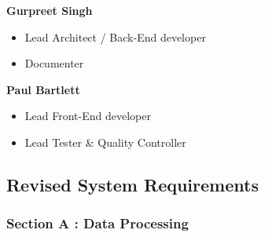 \documentclass[11pt,]{article}
\begin{document}
\textbf{Gurpreet Singh}

\begin{itemize}
\item
  Lead Architect / Back-End developer
\item
  Documenter
\end{itemize}

\textbf{Paul Bartlett}

\begin{itemize}
\item
  Lead Front-End developer
\item
  Lead Tester \& Quality Controller
\end{itemize}

\hypertarget{revised-system-requirements}{%
\subsection{Revised System
Requirements}\label{revised-system-requirements}}

\hypertarget{section-a-data-processing}{%
\subsubsection{Section A : Data
Processing}\label{section-a-data-processing}}
\end{document}
